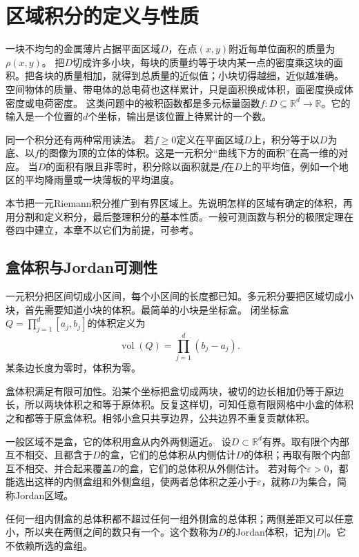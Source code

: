 \section{区域积分的定义与性质}
\label{sec:multivariable-region-integration}

一块不均匀的金属薄片占据平面区域$D$，在点$(x,y)$附近每单位面积的质量为$\rho(x,y)$。
把$D$切成许多小块，每块的质量约等于块内某一点的密度乘这块的面积。把各块的质量相加，就得到总质量的近似值；小块切得越细，近似越准确。
空间物体的质量、带电体的总电荷也这样累计，只是面积换成体积，面密度换成体密度或电荷密度。
这类问题中的被积函数都是多元标量函数$f:D\subseteq\mathbb R^d\to\mathbb R$。它的输入是一个位置的$d$个坐标，输出是该位置上待累计的一个数。

同一个积分还有两种常用读法。
若$f\geq0$定义在平面区域$D$上，积分等于以$D$为底、以$f$的图像为顶的立体的体积。这是一元积分“曲线下方的面积”在高一维的对应。
当$D$的面积有限且非零时，积分除以面积就是$f$在$D$上的平均值，例如一个地区的平均降雨量或一块薄板的平均温度。

本节把一元Riemann积分推广到有界区域上。先说明怎样的区域有确定的体积，再用分割和定义积分，最后整理积分的基本性质。一般可测函数与积分的极限定理在卷四中建立，本章不以它们为前提，可参考。

\subsection{盒体积与Jordan可测性}

一元积分把区间切成小区间，每个小区间的长度都已知。多元积分要把区域切成小块，首先需要知道小块的体积。最简单的小块是坐标盒。
闭坐标盒$Q=\prod_{j=1}^d[a_j,b_j]$的体积定义为
\[
 \operatorname{vol}(Q)=\prod_{j=1}^d(b_j-a_j).
\]
某条边长度为零时，体积为零。

盒体积满足有限可加性。沿某个坐标把盒切成两块，被切的边长相加仍等于原边长，所以两块体积之和等于原体积。反复这样切，可知任意有限网格中小盒的体积之和都等于原盒体积。相邻小盒只共享边界，公共边界不重复贡献体积。

一般区域不是盒，它的体积用盒从内外两侧逼近。
设$D\subset\mathbb R^d$有界。取有限个内部互不相交、且都含于$D$的盒，它们的总体积从内侧估计$D$的体积；再取有限个内部互不相交、并合起来覆盖$D$的盒，它们的总体积从外侧估计。
若对每个$\varepsilon>0$，都能选出这样的内侧盒组和外侧盒组，使两者总体积之差小于$\varepsilon$，就称$D$为集合，简称Jordan区域。

任何一组内侧盒的总体积都不超过任何一组外侧盒的总体积；两侧差距又可以任意小，所以夹在两侧之间的数只有一个。这个数称为$D$的Jordan体积，记为$|D|$。它不依赖所选的盒组。


